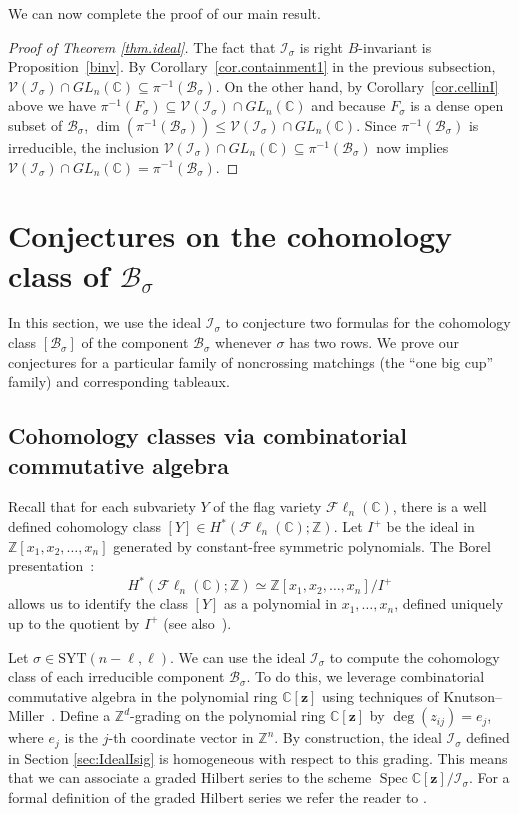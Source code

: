 \documentclass[11pt]{amsart}
\theoremstyle{remark}
\theoremstyle{remark}
\theoremstyle{definition}
\theoremstyle{definition}
\theoremstyle{definition}
\numberwithin{equation}{section}
\newcommand{\C}{\mathbb{C}}           %
\newcommand{\Z}{\mathbb{ Z}}           %
\newcommand{\spec}{\operatorname{Spec}}
\newcommand{\gs}{\sigma}
\newcommand{\cb}{\mathcal{B}}
\newcommand{\ci}{\mathcal{I}}
\newcommand{\cv}{\mathcal{V}}
\newcommand{\SYT}{\mathrm{SYT}}
\newcommand{\SF}{\mathcal{B}}
\newcommand{\cell}{F_\gs}
\newcommand{\isigma}{\ci_\gs}
\newcommand{\Fl}{\mathcal{F}\ell}
\begin{document}
We can now complete the proof of our main result.

\begin{proof}[Proof of Theorem {\ref{thm.ideal}}] The fact that $\ci_\gs$ is right $B$-invariant is Proposition~\ref{binv}.  By Corollary~\ref{cor.containment1} in the previous subsection, $\cv(\ci_\gs)\cap GL_n(\C) \subseteq \pi^{-1}(\cb_\gs)$. On the other hand, by Corollary~\ref{cor.cellinI} above we have $\pi^{-1}(\cell) \subseteq \cv(\ci_\gs)\cap GL_n(\C)$ and because $\cell$ is a dense open subset of $\SF_\gs$, $\dim (\pi^{-1}(\SF_\gs)) \leq \cv(\ci_\gs)\cap GL_n(\C)$. Since $\pi^{-1}(\SF_\gs)$ is irreducible, the inclusion $\cv(\ci_\gs)\cap GL_n(\C) \subseteq \pi^{-1}(\cb_\gs)$ now implies $\cv(\ci_\gs)\cap GL_n(\C) = \pi^{-1}(\cb_\gs)$.
\end{proof}






\section{Conjectures on the cohomology class of $\SF_\gs$} \label{sec:cohomology}

In this section, we use the ideal $\ci_\gs$ to conjecture two formulas for the cohomology class $[\SF_\gs]$ of the component $\SF_\gs$ whenever $\gs$ has two rows. We prove our conjectures for a particular family of noncrossing matchings (the ``one big cup'' family) and corresponding tableaux. 



\subsection{Cohomology classes via combinatorial commutative algebra} 
Recall that for each subvariety $Y$ of the flag variety $\Fl_n(\C)$, there is a well defined cohomology class $[Y]\in H^*(\Fl_n(\C); \Z)$. Let $I^+$ be the ideal in $\Z[x_1, x_2, \ldots, x_n]$ generated by constant-free symmetric polynomials. 
The Borel presentation~\cite{Borel}: 
\[
H^*(\Fl_n(\C); \Z) \simeq \Z[x_1, x_2, \ldots, x_n]/I^+
\]
allows us to identify the class $[Y]$ as a polynomial in $x_1,\ldots, x_n$, defined uniquely up to the quotient by $I^+$ (see also~\cite{Manivel, BilleyGaoPawlowski25}). 

Let $\gs\in \SYT(n-\ell, \ell)$. We can use the ideal $\isigma$ to compute the cohomology class of each irreducible component $\cb_\gs$. To do this, we leverage combinatorial commutative algebra in the polynomial ring $\C[\mathbf{z}]$ using techniques of Knutson--Miller~\cite{KnutsonMiller2005}. Define a $\Z^d$-grading  on the polynomial ring $\C[\mathbf{z}]$ by $\operatorname{deg}\left(z_{i j}\right)=e_j$, where $e_j$ is the $j$-th coordinate vector in $\mathbb{Z}^n$. By construction, the ideal $\ci_\gs$ defined in Section \ref{sec:IdealIsig} is homogeneous with respect to this grading. This means that we can associate a graded Hilbert series to the scheme $\spec \C[\mathbf{z}]/\ci_\gs$. For a formal definition of the graded Hilbert series we refer the reader to \cite[\S 8.1, 8.2]{MillerSturmfels2005}. 
\end{document}
